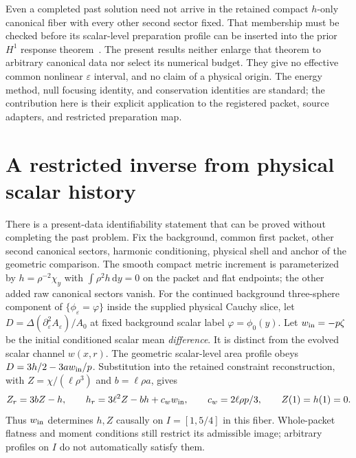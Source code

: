 \documentclass[11pt]{article}
\newcommand{\dd}{\,\mathrm d}
\newcommand{\eps}{\varepsilon}
\begin{document}
Even a completed past solution need not arrive in the retained compact
$h$-only canonical fiber with every other second sector fixed. That
membership must be checked before its scalar-level preparation profile
can be inserted into the prior $H^1$ response theorem~\cite{h1}.
The present results neither enlarge that theorem to arbitrary canonical
data nor select its numerical budget. They give no effective common
nonlinear $\eps$ interval, and no claim of a physical origin.
The energy method, null focusing identity, and conservation identities
are standard; the contribution here is their explicit application to
the registered packet, source adapters, and restricted preparation map.

\appendix
\section{A restricted inverse from physical scalar history}
\label{sec:inverse}
There is a present-data identifiability statement that can be proved
without completing the past problem. Fix the background, common first
packet, other second canonical sectors, harmonic conditioning, physical
shell and anchor of the geometric comparison. The smooth compact metric
increment is parameterized by $h=\rho^{-2}\chi_y$ with
$\int\rho^2h\dd y=0$ on the packet and flat endpoints; the other added raw
canonical sectors vanish. For the continued background three-sphere
component of $\{\phi_\eps=\varphi\}$ inside the supplied physical Cauchy
slice, let $D=\Delta(\partial_\eps^2 A_\eps)/A_0$ at fixed background
scalar label $\varphi=\phi_0(y)$.
Let $w_{\rm in}=-p\zeta$
be the initial conditioned scalar mean \emph{difference}.
It is distinct from the evolved scalar channel $w(x,r)$.
The geometric scalar-level area profile obeys
$D=3h/2-3aw_{\rm in}/p$. Substitution into the retained constraint
reconstruction, with $Z=\chi/(\ell\rho^3)$ and $b=\ell\rho a$, gives
\begin{equation}
 Z_r=3bZ-h,\qquad
 h_r=3\ell^2 Z-bh+c_w w_{\rm in},\qquad
 c_w=2\ell\rho p/3,\qquad Z(1)=h(1)=0.
 \label{eq:inverseivp}
\end{equation}
Thus $w_{\rm in}$ determines $h,Z$ causally on $I=[1,5/4]$ in this
fiber. Whole-packet flatness and moment conditions still restrict its
admissible image; arbitrary profiles on $I$ do not automatically satisfy
them.
\end{document}
